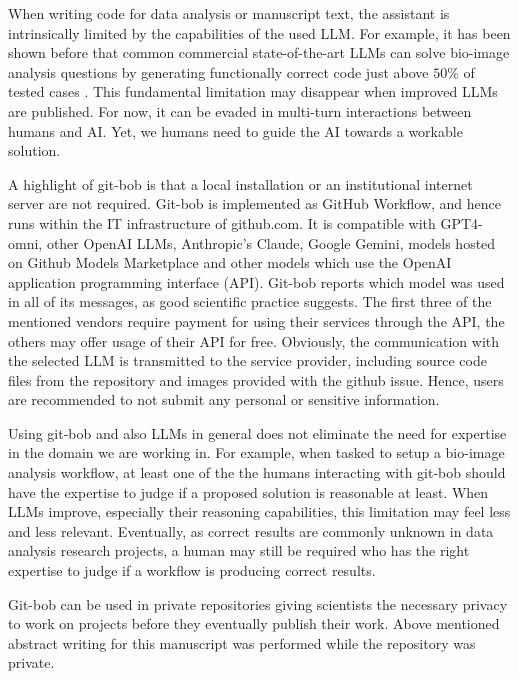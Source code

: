 \documentclass{ecai}
\begin{document}
When writing code for data analysis or manuscript text, the assistant is intrinsically limited by the capabilities of the used LLM. For example, it has been shown before that common commercial state-of-the-art LLMs can solve bio-image analysis questions by generating functionally correct code just above $50\%$ of tested cases \citep{benchmark_llm_bia}. This fundamental limitation may disappear when improved LLMs are published. For now, it can be evaded in multi-turn interactions between humans and AI. Yet, we humans need to guide the AI towards a workable solution. 

A highlight of git-bob is that a local installation or an institutional internet server are not required. Git-bob is implemented as GitHub Workflow, and hence runs within the IT infrastructure of github.com. It is compatible with GPT4-omni, other OpenAI LLMs, Anthropic's Claude, Google Gemini, models hosted on Github Models Marketplace and other models which use the OpenAI application programming interface (API). Git-bob reports which model was used in all of its messages, as good scientific practice suggests. The first three of the mentioned vendors require payment for using their services through the API, the others may offer usage of their API for free. Obviously, the communication with the selected LLM is transmitted to the service provider, including source code files from the repository and images provided with the github issue. Hence, users are recommended to not submit any personal or sensitive information. 

Using git-bob and also LLMs in general does not eliminate the need for expertise in the domain we are working in. For example, when tasked to setup a bio-image analysis workflow, at least one of the the humans interacting with git-bob should have the expertise to judge if a proposed solution is reasonable at least. When LLMs improve, especially their reasoning capabilities, this limitation may feel less and less relevant. Eventually, as correct results are commonly unknown in data analysis research projects, a human  may still be required who has the right expertise to judge if a workflow is producing correct results.

Git-bob can be used in private repositories giving scientists the necessary privacy to work on projects before they eventually publish their work. Above mentioned abstract writing for this manuscript was performed while the repository was private.

\end{document}

